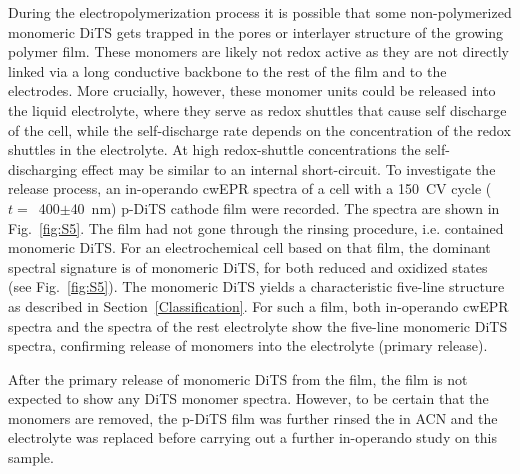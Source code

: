 During the electropolymerization process it is possible that some non-polymerized monomeric DiTS gets trapped in the pores or interlayer structure of the growing polymer film. These monomers are likely not redox active as they are not directly linked via a long conductive backbone to the rest of the film and to the electrodes. More crucially, however, these monomer units could be released into the liquid electrolyte, where they serve as redox shuttles that cause self discharge of the cell, while the self-discharge rate depends on the concentration of the redox shuttles in the electrolyte. At high redox-shuttle concentrations the self-discharging effect may be similar to an internal short-circuit. To investigate the release process, an in-operando cwEPR spectra of a cell with a 150~CV cycle ($t =$~400$\pm$40~nm) p-DiTS cathode film were recorded. The spectra are shown in Fig.~\ref{fig:S5}. The film had not gone through the rinsing procedure, i.e. contained monomeric DiTS. For an electrochemical cell based on that film, the dominant spectral signature is of monomeric DiTS, for both reduced and oxidized states (see Fig.~\ref{fig:S5}). The monomeric DiTS yields a characteristic five-line structure as described in Section~\ref{Classification}. For such a film, both in-operando cwEPR spectra and the spectra of the rest electrolyte show the five-line monomeric DiTS spectra, confirming release of monomers into the electrolyte (primary release).

\par
After the primary release of monomeric DiTS from the film, the film is not expected to show any DiTS monomer spectra. However, to be certain that the monomers are removed, the p-DiTS film was further rinsed the in ACN and the electrolyte was replaced before carrying out a further in-operando study on this sample.

